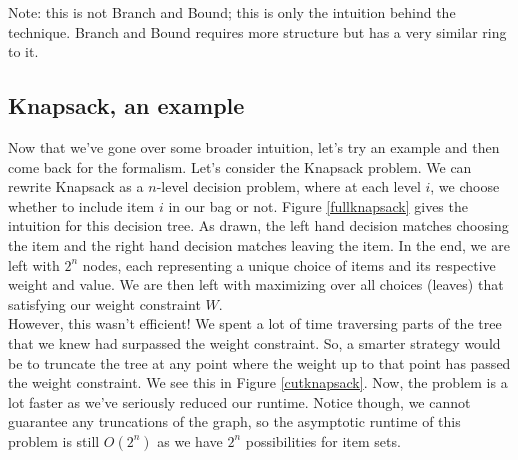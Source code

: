 \documentclass[11pt]{article}
\theoremstyle{plain}
\theoremstyle{definition}
\numberwithin{equation}{section}
\numberwithin{figure}{section}
\begin{document}
\noindent Note: this is not Branch and Bound; this is only the intuition behind the technique. Branch and Bound requires more structure but has a very similar ring to it.

\subsection{Knapsack, an example}
Now that we've gone over some broader intuition, let's try an example and then come back for the formalism. Let's consider the Knapsack problem. We can rewrite Knapsack as a $n$-level decision problem, where at each level $i$, we choose whether to include item $i$ in our bag or not. Figure \ref{fullknapsack} gives the intuition for this decision tree. As drawn, the left hand decision matches choosing the item and the right hand decision matches leaving the item. In the end, we are left with $2^n$ nodes, each representing a unique choice of items and its respective weight and value. We are then left with maximizing over all choices (leaves) that satisfying our weight constraint $W$. \\

\noindent However, this wasn't efficient! We spent a lot of time traversing parts of the tree that we knew had surpassed the weight constraint. So, a smarter strategy would be to truncate the tree at any point where the weight up to that point has passed the weight constraint. We see this in Figure \ref{cutknapsack}. Now, the problem is a lot faster as we've seriously reduced our runtime.  Notice though, we cannot guarantee any truncations of the graph, so the asymptotic runtime of this problem is still $O(2^n)$ as we have $2^n$ possibilities for item sets.
\end{document}
